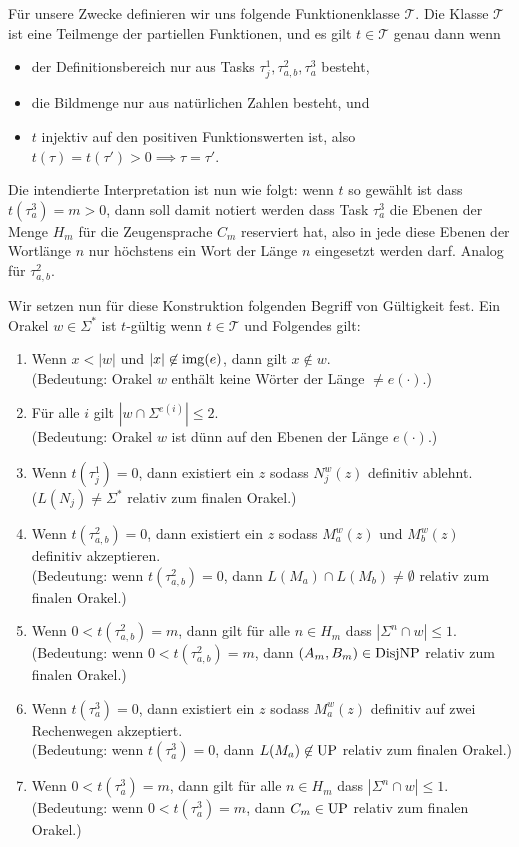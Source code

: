 Für unsere Zwecke definieren wir uns folgende Funktionenklasse $\mathcal T$. Die Klasse $\mathcal T$ ist eine Teilmenge der partiellen Funktionen, und es gilt $t\in\mathcal T$ genau dann wenn 
\begin{itemize}[nosep]
    \item der Definitionsbereich nur aus Tasks $\tau^1_j, \tau^2_{a,b}, \tau^3_a$ besteht, 
    \item die Bildmenge nur aus natürlichen Zahlen besteht, und
    \item $t$ injektiv auf den positiven Funktionswerten ist, also $t(\tau)=t(\tau')>0 \implies \tau=\tau'$.
\end{itemize}
Die intendierte Interpretation ist nun wie folgt: wenn $t$ so gewählt ist dass $t(\tau^3_a)=m>0$, dann soll damit notiert werden dass Task $\tau^3_a$ die Ebenen der Menge $H_m$ für die Zeugensprache $C_m$ reserviert hat, also in jede diese Ebenen der Wortlänge $n$ nur höchstens ein Wort der Länge $n$ eingesetzt werden darf. Analog für $\tau^2_{a,b}$.

Wir setzen nun für diese Konstruktion folgenden Begriff von Gültigkeit fest.
Ein Orakel $w\in\Sigma^*$ ist $t$-gültig wenn $t\in\mathcal T$ und Folgendes gilt:
\begin{enumerate}[label={V\arabic*}]
    \item Wenn $x<|w|$ und $|x|\not\in \operatorname{img}(e)$, dann gilt $x\not\in w$.\\
        (Bedeutung: Orakel $w$ enthält keine Wörter der Länge $\neq e(\cdot)$.)
    \item Für alle $i$ gilt $|w\cap \Sigma^{e(i)}|\leq 2$.\\
        (Bedeutung: Orakel $w$ ist dünn auf den Ebenen der Länge $e(\cdot)$.)
    \item Wenn $t(\tau^1_j)=0$, dann existiert ein $z$ sodass $N_j^w(z)$ definitiv ablehnt.\\
        ($L(N_j)\neq \Sigma^*$ relativ zum finalen Orakel.)
    \item Wenn $t(\tau^2_{a,b})=0$, dann existiert ein $z$ sodass $M_a^w(z)$ und $M_b^w(z)$ definitiv akzeptieren.\\
        (Bedeutung: wenn $t(\tau^2_{a,b})=0$, dann $L(M_a)\cap L(M_b)\neq \emptyset$ relativ zum finalen Orakel.)
    \item Wenn $0<t(\tau^2_{a,b})=m$, dann gilt für alle $n\in H_m$ dass $|\Sigma^{n}\cap w|\leq 1$.\\
        (Bedeutung: wenn $0<t(\tau^2_{a,b})=m$, dann $(A_m,B_m)\in\mathrm{DisjNP}$ relativ zum finalen Orakel.)
    \item Wenn $t(\tau^3_{a})=0$, dann existiert ein $z$ sodass $M_a^w(z)$ definitiv auf zwei Rechenwegen akzeptiert.\\
        (Bedeutung: wenn $t(\tau^3_{a})=0$, dann $L(M_a)\not\in \mathrm{UP}$ relativ zum finalen Orakel.)
    \item Wenn $0<t(\tau^3_{a})=m$, dann gilt für alle $n\in H_m$ dass $|\Sigma^n\cap w|\leq 1$.\\
        (Bedeutung: wenn $0<t(\tau^3_{a})=m$, dann $C_m\in\mathrm{UP}$ relativ zum finalen Orakel.)
\end{enumerate}


